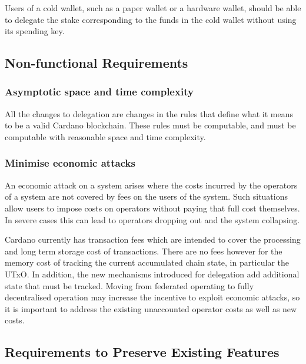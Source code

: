 \documentclass[11pt,a4paper]{article}
\begin{document}
Users of a cold wallet, such as a paper wallet or a hardware wallet,
should be able to delegate the stake corresponding to the funds in the
cold wallet without using its spending key.

\subsection{Non-functional Requirements}
\label{non-functional-requirements}

\subsubsection{Asymptotic space and time complexity}
\label{asymptotic-space-and-time-complexity}

All the changes to delegation are changes in the rules that define what
it means to be a valid Cardano blockchain. These rules must be
computable, and must be computable with reasonable space and time
complexity.

\subsubsection{Minimise economic attacks}
\label{minimise-economic-attacks}

An economic attack on a system arises where the costs incurred by the
operators of a system are not covered by fees on the users of the
system. Such situations allow users to impose costs on operators without
paying that full cost themselves. In severe cases this can lead to
operators dropping out and the system collapsing.

Cardano currently has transaction fees which are intended to cover the
processing and long term storage cost of transactions. There are no fees
however for the memory cost of tracking the current accumulated chain
state, in particular the UTxO. In addition, the new mechanisms
introduced for delegation add additional state that must be tracked.
Moving from federated operating to fully decentralised operation may
increase the incentive to exploit economic attacks, so it is important
to address the existing unaccounted operator costs as well as new costs.

\subsection{Requirements to Preserve Existing Features}
\label{requirements-to-preserve-existing-features}
\end{document}
